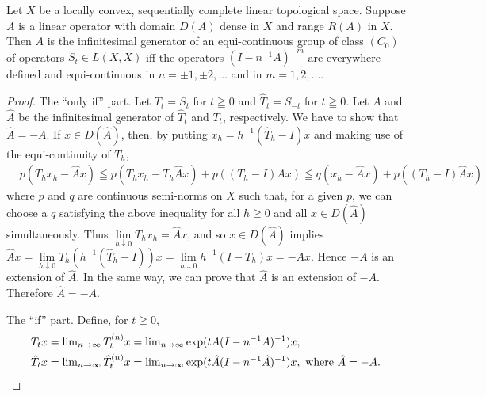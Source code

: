 \begin{theoremu} Let $X$ be a locally convex, sequentially complete linear topological space. Suppose $A$ is a linear operator with domain $D(A)$ dense in $X$ and range $R(A)$ in $X$. Then $A$ is the infinitesimal generator of an equi-continuous group of class $(C_{0})$ of operators $S_{t} \in L(X, X)$ iff the operators $(I - n^{-1}A)^{-m}$ are everywhere defined and equi-continuous in $n = \pm 1, \pm 2, \ldots$ and in $m = 1, 2, \ldots$. 
\end{theoremu}

\begin{proof}
 The ``only if'' part. Let $T_{t}=S_{t}$ for $t\geqq0$ and $\hat{T}_{t}=S_{-t}$ for $t\geqq0$. Let $A$ and $\hat{A}$ be the infinitesimal generator of $\hat{T}_{t}$ and $T_{t}$, respectively. We have to show that $\hat{A}=-A$. If $x\in D(\hat{A})$, then, by putting $x_{h}=h^{-1}(\hat{T}_{h}-I)x$ and making use of the equi-continuity of $T_{h}$, 
\[
\begin{aligned}
&p (T _{h} x _{h} - \hat {A} x)  \leqq p (T _{h} x _{h} - T _{h} \hat {A} x) + p ((T _{h} - I) A x) \leqq q (x _{h} - \hat {A} x) + p ((T _{h} - I) \hat {A} x)
\end{aligned}
\]
where $p$ and $q$ are continuous semi-norms on $X$ such that, for a given $p$, we can choose a $q$ satisfying the above inequality for all $h \geqq 0$ and all $x \in D(\hat{A})$ simultaneously. Thus $\lim\limits_{h \downarrow 0} T_h x_h = \hat{A} x$, and so $x \in D(\hat{A})$ implies $\hat{A} x = \lim\limits_{h \downarrow 0} T_h (h^{-1}(\hat{T}_h - I)) x = \lim\limits_{h \downarrow 0} h^{-1}(I - T_h) x = -Ax$. Hence $-A$ is an extension of $\hat{A}$. In the same way, we can prove that $\hat{A}$ is an extension of $-A$. Therefore $\hat{A} = -A$. 

The ``if'' part. Define, for $t \geqq 0$, 
\begin{align}
T _{t} x& = \lim\limits _{n \rightarrow \infty} T _{t} ^{(n)} x = \lim\limits _{n \rightarrow \infty} \exp (t A (I - n ^{-1} A) ^{-1}) x, \notag \\
\hat {T} _{t} x& = \lim\limits _{n \rightarrow \infty} \hat {T} _{t} ^{(n)} x = \lim\limits _{n \rightarrow \infty} \exp (t \hat {A} (I - n ^{-1} \hat {A}) ^{-1}) x, \text{ where } \hat {A} = - A. \notag
\end{align}


\end{proof}
